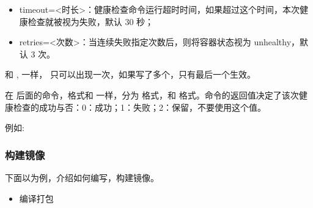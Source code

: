 \documentclass[letterpaper,10pt,english]{sphinxmanual}
\begin{document}
\begin{itemize}
\begin{itemize}
\item {} 
\textendash{}timeout=\textless{}时长\textgreater{}：健康检查命令运行超时时间，如果超过这个时间，本次健康检查就被视为失败，默认 30 秒；

\item {} 
\textendash{}retries=\textless{}次数\textgreater{}：当连续失败指定次数后，则将容器状态视为 unhealthy，默认 3 次。

\end{itemize}

和 ,  一样， 只可以出现一次，如果写了多个，只有最后一个生效。

在  后面的命令，格式和  一样，分为  格式，和  格式。命令的返回值决定了该次健康检查的成功与否：0：成功；1：失败；2：保留，不要使用这个值。

例如:

\begin{sphinxVerbatim}[commandchars=\\\{\}]
 
           
   \PYGZbs{}
        
\end{sphinxVerbatim}

\end{itemize}


\subsubsection{构建镜像}
\label{\detokenize{docker/practice:id9}}
下面以为例，介绍如何编写，构建镜像。
\begin{itemize}
\item {} 
编译打包

\end{itemize}
\end{document}
